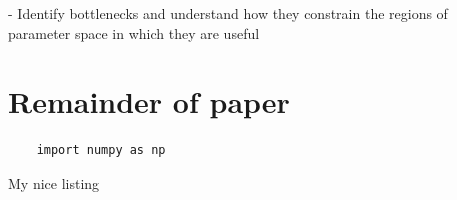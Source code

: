    - Identify bottlenecks and understand how they constrain the regions of parameter space in which they are useful

   
    \section{Remainder of paper}




\begin{listing}
	\begin{verbatim} 
	import numpy as np
	\end{verbatim}
  \caption{My nice listing}
  \label{lst:nice_listing}
\end{listing}
